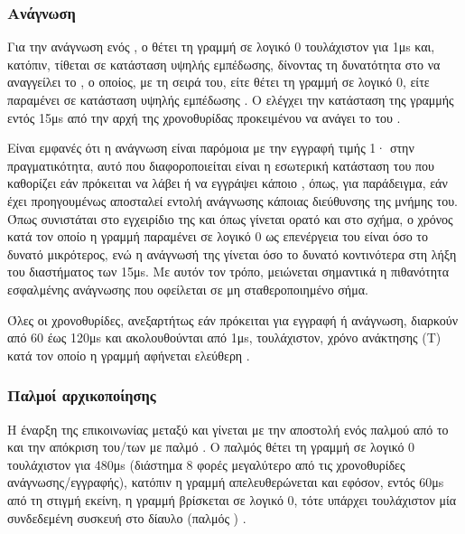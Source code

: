 \subsubsection{Ανάγνωση}

Για την ανάγνωση ενός , ο  θέτει τη γραμμή σε λογικό 0
τουλάχιστον για 1μs και, κατόπιν, τίθεται σε κατάσταση υψηλής εμπέδωσης,
δίνοντας τη δυνατότητα στο  να αναγγείλει το , ο οποίος, με τη
σειρά του, είτε θέτει τη γραμμή σε λογικό 0, είτε παραμένει σε κατάσταση υψηλής
εμπέδωσης \parencite[2]{atmel04}. Ο  ελέγχει την κατάσταση της
γραμμής εντός 15μs από την αρχή της χρονοθυρίδας \parencite[17]{ds18b20}
προκειμένου να ανάγει το  του .

Είναι εμφανές ότι η ανάγνωση είναι παρόμοια με την εγγραφή  τιμής 1·
στην πραγματικότητα, αυτό που διαφοροποιείται είναι η εσωτερική κατάσταση του
 που καθορίζει εάν πρόκειται να λάβει ή να εγγράψει κάποιο ,
όπως, για παράδειγμα, εάν έχει προηγουμένως αποσταλεί εντολή ανάγνωσης κάποιας
διεύθυνσης της μνήμης του.
Όπως συνιστάται στο εγχειρίδιο της \textcite[17]{ds18b20} και όπως γίνεται ορατό
και στο σχήμα, ο χρόνος κατά τον οποίο η γραμμή παραμένει σε λογικό 0 ως
επενέργεια του  είναι όσο το δυνατό μικρότερος, ενώ η ανάγνωσή της
γίνεται όσο το δυνατό κοντινότερα στη λήξη του διαστήματος των 15μs. Με αυτόν
τον τρόπο, μειώνεται σημαντικά η πιθανότητα εσφαλμένης ανάγνωσης που οφείλεται
σε μη σταθεροποιημένο σήμα.

Όλες οι χρονοθυρίδες, ανεξαρτήτως εάν πρόκειται για εγγραφή ή ανάγνωση, διαρκούν
από 60 έως 120μs και ακολουθούνται από 1μs, τουλάχιστον, χρόνο ανάκτησης
(T) κατά τον οποίο η γραμμή αφήνεται ελεύθερη
\parencites[15--16]{ds18b20}[2]{atmel04}.


\subsubsection{Παλμοί αρχικοποίησης}
\label{ssubsec:1-wire:initialisation}

Η έναρξη της επικοινωνίας μεταξύ  και  γίνεται με την
αποστολή ενός παλμού  από το  και την απόκριση
του\slash{}των  με παλμό  \parencite[15]{ds18b20}. Ο
παλμός  θέτει τη γραμμή σε λογικό 0 τουλάχιστον για 480μs (διάστημα 8
φορές μεγαλύτερο από τις χρονοθυρίδες ανάγνωσης\slash{}εγγραφής), κατόπιν η
γραμμή απελευθερώνεται και εφόσον, εντός 60μs από τη στιγμή εκείνη, η γραμμή
βρίσκεται σε λογικό 0, τότε υπάρχει τουλάχιστον μία συνδεδεμένη 
συσκευή στο δίαυλο (παλμός ) \parencite[3]{atmel04}.


